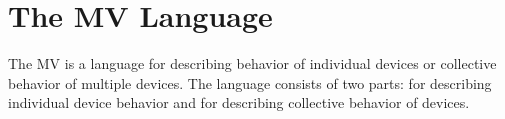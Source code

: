\documentclass{note}
\begin{document}
{%






\section{The MV Language}
The MV is a language for describing behavior of individual devices
or collective behavior of multiple devices.
The language consists of two parts: \textcolor{blue2}{}
for describing individual device behavior
and  \textcolor{blue2}{} for describing
collective behavior of devices.



}
\end{document}
